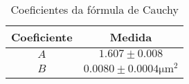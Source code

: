 \begin{table}[H]
	\centering
	\begin{tabular}{cc}
		\toprule\toprule
            {\bfseries Coeficiente} & {\bfseries Medida}
        \\\midrule
            $A$ & $1.607 \pm 0.008$ \\
            $B$ & $0.0080 \pm 0.0004 \si{\micro\meter^2}$
        \\\bottomrule\bottomrule
	\end{tabular}

	\caption{Coeficientes da fórmula de Cauchy}
	\label{tab:regres}
\end{table}
